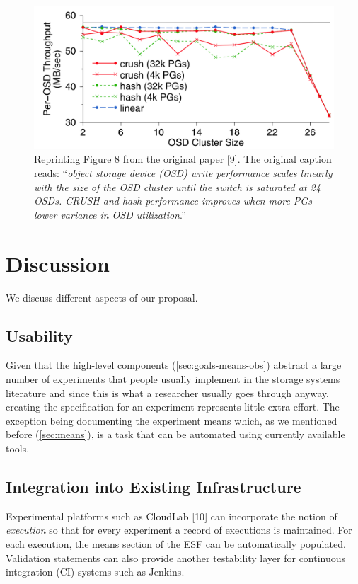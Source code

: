 \documentclass[10pt,reprint]{sigplanconf}
\renewcommand*{\hyperref}[2][\ar]{\def\ar{#2}#2\autoref{#1}}
\begin{document}
\begin{figure}[htbp]
\centering
\includegraphics{figures/figure8.png}
\caption{Reprinting Figure 8 from the original paper {[}9{]}. The
original caption reads: ``\emph{object storage device (OSD) write
performance scales linearly with the size of the OSD cluster until the
switch is saturated at 24 OSDs. CRUSH and hash performance improves when
more PGs lower variance in OSD utilization}.''}
\end{figure}

\section{Discussion}\label{discussion}

We discuss different aspects of our proposal.

\subsection{Usability}\label{usability}

Given that the high-level components (\hyperref[sec:goals-means-obs]{})
abstract a large number of experiments that people usually implement in
the storage systems literature and since this is what a researcher
usually goes through anyway, creating the specification for an
experiment represents little extra effort. The exception being
documenting the experiment means which, as we mentioned before
(\hyperref[sec:means]{}), is a task that can be automated using
currently available tools.

\subsection{Integration into Existing
Infrastructure}\label{integration-into-existing-infrastructure}

Experimental platforms such as CloudLab {[}10{]} can incorporate the
notion of \emph{execution} so that for every experiment a record of
executions is maintained. For each execution, the means section of the
ESF can be automatically populated. Validation statements can also
provide another testability layer for continuous integration (CI)
systems such as Jenkins.
\end{document}
